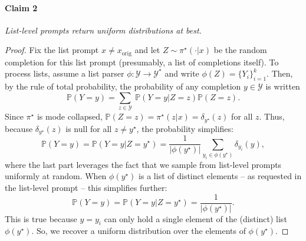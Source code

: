 \paragraph{Claim 2} \textit{List-level prompts return uniform distributions at best.}
\begin{proof}
Fix the list prompt $x \neq x_\text{orig}$ and let $Z \sim \pi^\star(\cdot | x)$ be the random completion for this list prompt (presumably, a list of completions itself). To process lists, assume a list parser $\phi : \mathcal{Y} \to \mathcal{Y}^*$ and write $\phi(Z) = \{Y_i\}_{i=1}^k$. Then, by the rule of total probability, the probability of any completion $y \in \mathcal{Y}$ is written
\begin{equation}
    \mathbb{P}(Y = y) = \sum_{z \in \mathcal{Y}} \ \mathbb{P}(Y = y | Z = z)\mathbb{P}(Z = z).
\end{equation}
Since $\pi^\star$ is mode collapsed, $\mathbb{P}(Z = z) = \pi^\star(z | x) = \delta_{y^\star}(z)$ for all $z$. Thus, because $\delta_{y^\star}(z)$ is null for all $z \neq y^\star$, the probability simplifies:
\begin{equation}
    \mathbb{P}(Y = y) = \mathbb{P}(Y = y | Z = y^\star) = \frac{1}{|\phi(y^\star)|} \sum_{y_i \in \phi(y^\star)}  \delta_{y_i}(y),
\end{equation}
where the last part leverages the fact that we sample from list-level prompts uniformly at random. When $\phi(y^\star)$ is a list of distinct elements -- as requested in the list-level prompt -- this simplifies further:
\begin{equation}
    \mathbb{P}(Y = y) = \mathbb{P}(Y = y | Z = y^\star) = \frac{1}{|\phi(y^\star)|}.
\end{equation}
This is true because $y = y_i$ can only hold a single element of the (distinct) list $\phi(y^\star)$. So, we recover a uniform distribution over the elements of $\phi(y^\star)$.
\end{proof}

